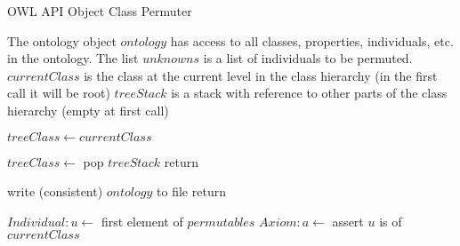 \documentclass{article}
\begin{document}





\begin{algorithm}
  \caption{OWL API Object Class Permuter}
  \begin{algorithmic}[0]

    \State The ontology object $ontology$ has access to all classes, properties, individuals, etc. in the ontology.
    \State The list $unknowns$ is a list of individuals to be permuted.
    \State $currentClass$ is the class at the current level in the class hierarchy (in the first call it will be root)
    \State $treeStack$ is a stack with reference to other parts of the class hierarchy (empty at first call)
    \State
    
    $treeClass \leftarrow currentClass$

    \State $treeClass \leftarrow$ pop $treeStack$
    \State return
    \State
    \EndIf

    
		\State write (consistent) $ontology$ to file
		\State return
		\State
	\EndIf

	\State $Individual:u \leftarrow$ first element of $permutables$
    \State $Axiom:a \leftarrow$ assert $u$ is of $currentClass$


\end{algorithmic}
\end{algorithm}
\end{document}

